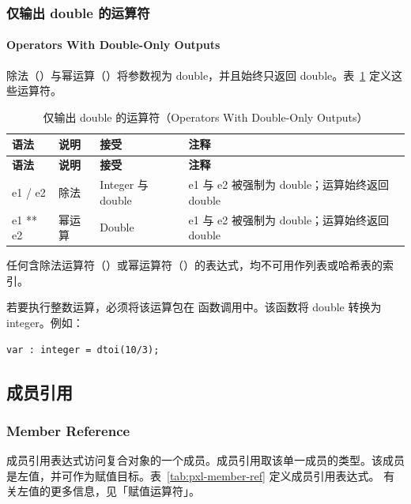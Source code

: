 \subsubsection{仅输出 double 的运算符}
\paragraph*{Operators With Double-Only Outputs}

除法（\cmd{/}）与幂运算（\cmd{**}）将参数视为 double，并且始终只返回 double。表~\ref{tab:pxl-double-ops} 定义这些运算符。

\begin{longtable}{@{}>{\raggedright\arraybackslash\ttfamily}p{} p{} p{} p{}@{}}
\caption{仅输出 double 的运算符（Operators With Double-Only Outputs）}\label{tab:pxl-double-ops}\\
\toprule
\textbf{\textrm{语法}} & \textbf{\textrm{说明}} & \textbf{\textrm{接受}} & \textbf{\textrm{注释}} \\
\midrule
\endfirsthead
\toprule
\textbf{\textrm{语法}} & \textbf{\textrm{说明}} & \textbf{\textrm{接受}} & \textbf{\textrm{注释}} \\
\midrule
\endhead
\bottomrule
\endfoot
e1 / e2 & 除法 & Integer 与 double & e1 与 e2 被强制为 double；运算始终返回 double \\
e1 ** e2 & 幂运算 & Double & e1 与 e2 被强制为 double；运算始终返回 double \\
\end{longtable}

\begin{noteBox}
任何含除法运算符（\cmd{/}）或幂运算符（\cmd{**}）的表达式，均不可用作列表或哈希表的索引。
\end{noteBox}

若要执行整数运算，必须将该运算包在  函数调用中。该函数将 double 转换为 integer。例如：
\begin{lstlisting}[style=pxl]
var : integer = dtoi(10/3);
\end{lstlisting}

\subsection{成员引用}
\subsubsection*{Member Reference}

成员引用表达式访问复合对象的一个成员。成员引用取该单一成员的类型。该成员是左值，并可作为赋值目标。表~\ref{tab:pxl-member-ref} 定义成员引用表达式。
有关左值的更多信息，见「赋值运算符」。

